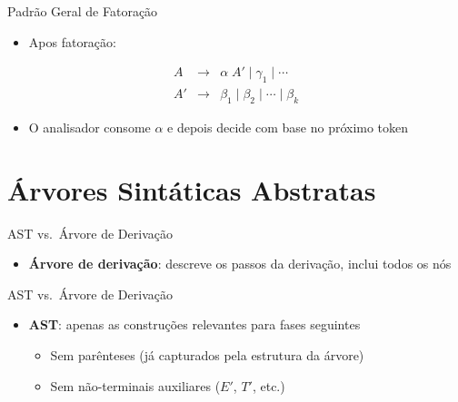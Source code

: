 \begin{frame}{Padrão Geral de Fatoração}

    \begin{itemize}

        \item
        Apos fatoração:
    \end{itemize}

    \[\begin{array}{lcl}
    A  &\to& \alpha\;A' \mid \gamma_1 \mid \cdots \\
    A' &\to& \beta_1 \mid \beta_2 \mid \cdots \mid \beta_k
\end{array}\]

\begin{itemize}

    \item
    O analisador consome \(\alpha\) e depois decide com base no próximo
    token
\end{itemize}
\end{frame}


\section{Árvores Sintáticas
Abstratas}\label{uxe1rvores-sintuxe1ticas-abstratas}

\begin{frame}{AST vs.~Árvore de Derivação}

    \begin{itemize}

        \item
        \textbf{Árvore de derivação}: descreve os passos da derivação, inclui
        todos os nós
    \end{itemize}
\end{frame}

\begin{frame}{AST vs.~Árvore de Derivação}

    \begin{itemize}

        \item
        \textbf{AST}: apenas as construções relevantes para fases seguintes

        \begin{itemize}

            \item
            Sem parênteses (já capturados pela estrutura da árvore)
            \item
            Sem não-terminais auxiliares (\(E'\), \(T'\), etc.)
        \end{itemize}
    \end{itemize}
\end{frame}

